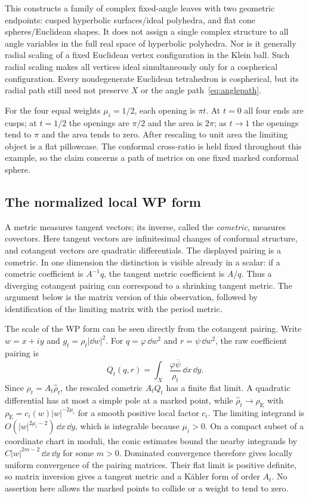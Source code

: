 This constructs a family of complex fixed-angle leaves with two
geometric endpoints: cusped hyperbolic surfaces/ideal polyhedra, and
flat cone spheres/Euclidean shapes. It does not assign a single
complex structure to all angle variables in the full real space of
hyperbolic polyhedra. Nor is it generally radial scaling of a fixed
Euclidean vertex configuration in the Klein ball. Such radial scaling
makes all vertices ideal simultaneously only for a cospherical
configuration. Every nondegenerate Euclidean tetrahedron is
cospherical, but its radial path still need not preserve $X$ or
the angle path~\eqref{eq:anglepath}.

For the four equal weights $\mu_i=1/2$, each opening is $\pi t$.
At $t=0$ all four ends are cusps; at $t=1/2$ the openings are
$\pi/2$ and the area is $2\pi$; as $t\to1$ the openings tend
to $\pi$ and the area tends to zero. After rescaling to unit
area the limiting object is a flat pillowcase. The conformal
cross-ratio is held fixed throughout this example, so the claim
concerns a path of metrics on one fixed marked conformal sphere.

\subsection{The normalized local WP form}

A metric measures tangent vectors; its inverse, called the
\emph{cometric}, measures covectors. Here tangent vectors are
infinitesimal changes of conformal structure, and cotangent vectors
are quadratic differentials. The displayed pairing is a cometric.
In one dimension the distinction is visible already in a scalar:
if a cometric coefficient is $A^{-1}q$, the tangent metric
coefficient is $A/q$. Thus a diverging cotangent pairing can
correspond to a shrinking tangent metric. The argument below is
the matrix version of this observation, followed by identification
of the limiting matrix with the period metric.

The scale of the WP form can be seen directly from the cotangent
pairing. Write $w=x+iy$ and $g_t=\rho_t|\dd w|^2$. For
$q=\varphi\,\dd w^2$ and $r=\psi\,\dd w^2$, the raw coefficient
pairing is
\[
 Q_t(q,r)=\int_X\frac{\varphi\overline\psi}{\rho_t}\,\dd x\,\dd y.
\]
Since $\rho_t=A_t\widehat\rho_t$, the rescaled cometric $A_tQ_t$
has a finite flat limit. A quadratic differential has at most a
simple pole at a marked point, while
$\widehat\rho_t\to\rho_{\mathrm E}$ with
$\rho_{\mathrm E}=c_i(w)|w|^{-2\mu_i}$ for a smooth positive local
factor $c_i$. The limiting integrand is
$O(|w|^{2\mu_i-2})\,\dd x\,\dd y$, which is integrable because
$\mu_i>0$. On a compact subset of a coordinate chart in moduli, the
conic estimates bound the nearby integrands by
$C|w|^{2m-2}\,\dd x\,\dd y$ for some $m>0$. Dominated convergence
therefore gives locally uniform convergence of the pairing matrices.
Their flat limit is positive definite, so matrix inversion gives a
tangent metric and a K\"ahler form of order $A_t$. No assertion here
allows the marked points to collide or a weight to tend to zero.

